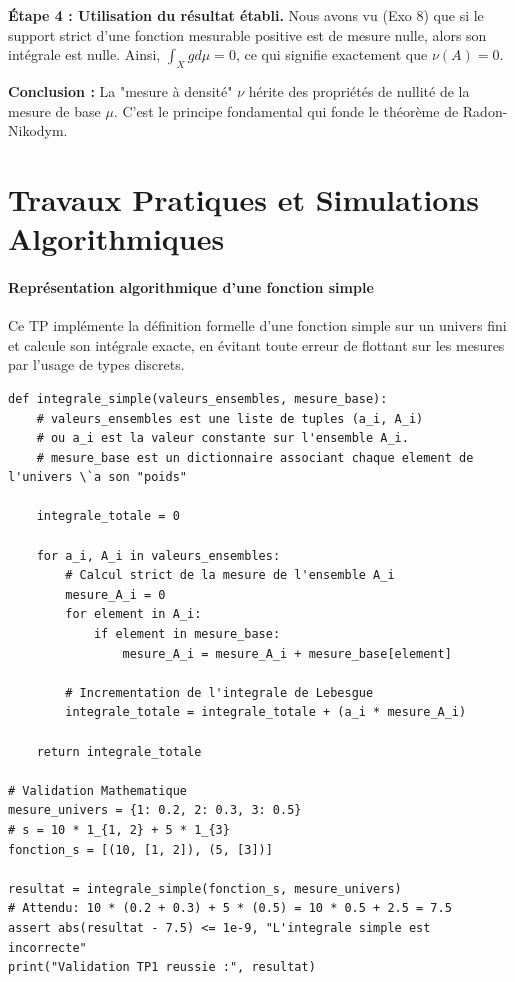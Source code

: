 \documentclass[11pt,a4paper]{article}
\begin{document}
\textbf{Étape 4 : Utilisation du r\'esultat \'etabli.}
Nous avons vu (Exo 8) que si le support strict d'une fonction mesurable positive est de mesure nulle, alors son int\'egrale est nulle.
Ainsi, $\int_X g d\mu = 0$, ce qui signifie exactement que $\nu(A) = 0$.

\textbf{Conclusion :}
La "mesure \`a densit\'e" $\nu$ h\'erite des propri\'et\'es de nullit\'e de la mesure de base $\mu$. C'est le principe fondamental qui fonde le th\'eor\`eme de Radon-Nikodym.




\newpage
\part{Travaux Pratiques et Simulations Algorithmiques}

\subsection*{Repr\'esentation algorithmique d'une fonction simple}

Ce TP impl\'emente la d\'efinition formelle d'une fonction simple sur un univers fini et calcule son int\'egrale exacte, en \'evitant toute erreur de flottant sur les mesures par l'usage de types discrets.

\begin{lstlisting}
def integrale_simple(valeurs_ensembles, mesure_base):
    # valeurs_ensembles est une liste de tuples (a_i, A_i)
    # ou a_i est la valeur constante sur l'ensemble A_i.
    # mesure_base est un dictionnaire associant chaque element de l'univers \`a son "poids"

    integrale_totale = 0

    for a_i, A_i in valeurs_ensembles:
        # Calcul strict de la mesure de l'ensemble A_i
        mesure_A_i = 0
        for element in A_i:
            if element in mesure_base:
                mesure_A_i = mesure_A_i + mesure_base[element]

        # Incrementation de l'integrale de Lebesgue
        integrale_totale = integrale_totale + (a_i * mesure_A_i)

    return integrale_totale

# Validation Mathematique
mesure_univers = {1: 0.2, 2: 0.3, 3: 0.5}
# s = 10 * 1_{1, 2} + 5 * 1_{3}
fonction_s = [(10, [1, 2]), (5, [3])]

resultat = integrale_simple(fonction_s, mesure_univers)
# Attendu: 10 * (0.2 + 0.3) + 5 * (0.5) = 10 * 0.5 + 2.5 = 7.5
assert abs(resultat - 7.5) <= 1e-9, "L'integrale simple est incorrecte"
print("Validation TP1 reussie :", resultat)
\end{lstlisting}
\end{document}
